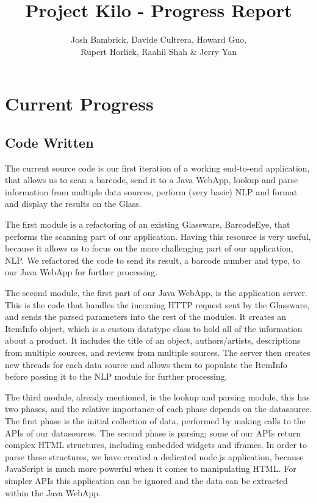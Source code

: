 \documentclass[12pt,a4paper]{report}
\title{Project Kilo - Progress Report}
\author{Josh Bambrick, Davide Cultrera, Howard Guo,\\ Rupert Horlick, Raahil Shah \& Jerry Yan}
\begin{document}
\maketitle

\tableofcontents

\chapter{Current Progress}

\section{Code Written}

The current source code is our first iteration of a working end-to-end application, that allows us to scan a barcode, send it to a Java WebApp, lookup and parse information from multiple data sources, perform (very basic) NLP and format and display the results on the Glass.

The first module is a refactoring of an existing Glassware, BarcodeEye, that performs the scanning part of our application. Having this resource is very useful, because it allows us to focus on the more challenging part of our application, NLP. We refactored the code to send its result, a barcode number and type, to our Java WebApp for further processing.

The second module, the first part of our Java WebApp, is the application server. This is the code that handles the incoming HTTP request sent by the Glassware, and sends the parsed parameters into the rest of the modules. It creates an ItemInfo object, which is a custom datatype class to hold all of the information about a product. It includes the title of an object, authors/artists, descriptions from multiple sources, and reviews from multiple sources. The server then creates new threads for each data source and allows them to populate the ItemInfo before passing it to the NLP module for further processing.

The third module, already mentioned, is the lookup and parsing module, this has two phases, and the relative importance of each phase depends on the datasource. The first phase is the initial collection of data, performed by making calls to the APIs of our datasources. The second phase is parsing; some of our APIs return complex HTML structures, including embedded widgets and iframes. In order to parse these structures, we have created a dedicated node.js application, because JavaScript is much more powerful when it comes to manipulating HTML. For simpler APIs this application can be ignored and the data can be extracted within the Java WebApp.
\end{document}
